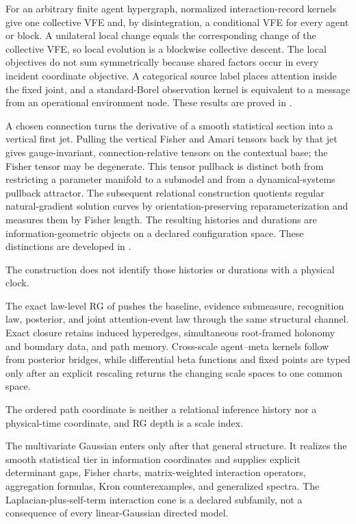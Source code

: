 For an arbitrary finite agent hypergraph, normalized interaction-record
kernels give one collective VFE and, by disintegration, a conditional VFE for
every agent or block.  A unilateral local change equals the corresponding
change of the collective VFE, so local evolution is a blockwise collective
descent.  The local objectives do not sum symmetrically because shared factors
occur in every incident coordinate objective.  A categorical source label
places attention inside the fixed joint, and a standard-Borel observation
kernel is equivalent to a message from an operational environment node.
These results are proved in .

A chosen connection turns the derivative of a smooth statistical section into
a vertical first jet.  Pulling the vertical Fisher and Amari tensors back by
that jet gives gauge-invariant, connection-relative tensors on the contextual
base; the Fisher tensor may be degenerate.  This tensor pullback is distinct
both from restricting a parameter manifold to a submodel and from a
dynamical-systems pullback attractor.  The subsequent relational construction
quotients regular natural-gradient solution curves by
orientation-preserving reparameterization and measures them by Fisher length.
The resulting histories and durations are information-geometric objects on a
declared configuration space. These distinctions are developed in
.

The construction does not identify those histories or durations with a
physical clock.

The exact law-level RG of  pushes the baseline,
evidence submeasure, recognition law, posterior, and joint attention-event law
through the same structural channel. Exact closure retains induced hyperedges,
simultaneous root-framed holonomy and boundary data, and path memory.
Cross-scale agent--meta kernels follow from posterior bridges, while differential beta
functions and fixed points are typed only after an explicit rescaling returns
the changing scale spaces to one common space.

The ordered path coordinate is neither a relational inference history nor a
physical-time coordinate, and RG depth is a scale index.

The multivariate Gaussian enters only after that general structure.  It
realizes the smooth statistical tier in information coordinates and supplies
explicit determinant gaps, Fisher charts, matrix-weighted interaction
operators, aggregation formulas, Kron counterexamples, and generalized
spectra.  The Laplacian-plus-self-term interaction cone is a declared
subfamily, not a consequence of every linear-Gaussian directed model.

